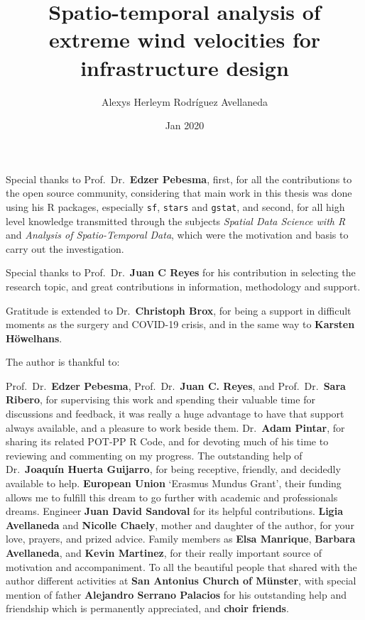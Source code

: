 \documentclass[12pt,oneside]{reedthesis}
\title{Spatio-temporal analysis of extreme wind velocities for infrastructure design}
\author{Alexys Herleym Rodríguez Avellaneda}
\date{Jan 2020}
\begin{document}
  \maketitle

\frontmatter %
\pagestyle{empty} %
  \begin{acknowledgements}
    Special thanks to Prof.~Dr.~\textbf{Edzer Pebesma}, first, for all the contributions to the open source community, considering that main work in this thesis was done using his R packages, especially \texttt{sf}, \texttt{stars} and \texttt{gstat}, and second, for all high level knowledge transmitted through the subjects \emph{Spatial Data Science with R} and \emph{Analysis of Spatio-Temporal Data}, which were the motivation and basis to carry out the investigation.
    
    \par
    
    Special thanks to Prof.~Dr.~\textbf{Juan C Reyes} for his contribution in selecting the research topic, and great contributions in information, methodology and support.
    
    \par
    
    Gratitude is extended to Dr.~\textbf{Christoph Brox}, for being a support in difficult moments as the surgery and COVID-19 crisis, and in the same way to \textbf{Karsten Höwelhans}.
    
    \par
    
    The author is thankful to:
    
    \par
    
    Prof.~Dr.~\textbf{Edzer Pebesma}, Prof.~Dr.~\textbf{Juan C. Reyes}, and Prof.~Dr.~\textbf{Sara Ribero}, for supervising this work and spending their valuable time for discussions and feedback, it was really a huge advantage to have that support always available, and a pleasure to work beside them. Dr.~\textbf{Adam Pintar}, for sharing its related POT-PP R Code, and for devoting much of his time to reviewing and commenting on my progress. The outstanding help of Dr.~\textbf{Joaquín Huerta Guijarro}, for being receptive, friendly, and decidedly available to help. \textbf{European Union} `Erasmus Mundus Grant', their funding allows me to fulfill this dream to go further with academic and professionals dreams. Engineer \textbf{Juan David Sandoval} for its helpful contributions. \textbf{Ligia Avellaneda} and \textbf{Nicolle Chaely}, mother and daughter of the author, for your love, prayers, and prized advice. Family members as \textbf{Elsa Manrique}, \textbf{Barbara Avellaneda}, and \textbf{Kevin Martinez}, for their really important source of motivation and accompaniment. To all the beautiful people that shared with the author different activities at \textbf{San Antonius Church of Münster}, with special mention of father \textbf{Alejandro Serrano Palacios} for his outstanding help and friendship which is permanently appreciated, and \textbf{choir friends}.
  \end{acknowledgements}
\end{document}
